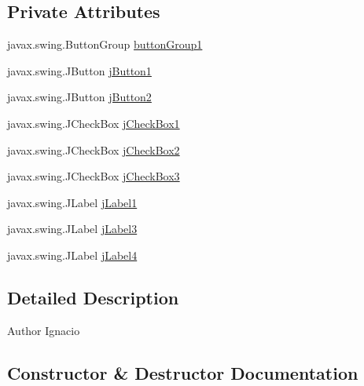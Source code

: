 \subsection*{Private Attributes}
\begin{DoxyCompactItemize}
\item 
javax.\+swing.\+Button\+Group \mbox{\hyperlink{classsoftware_1_1_aceptar_peticiones_a6530d813f8beb36dd957644716c9a51e}{button\+Group1}}
\item 
javax.\+swing.\+J\+Button \mbox{\hyperlink{classsoftware_1_1_aceptar_peticiones_a0dbb46cb648a55e144e5334959c9a068}{j\+Button1}}
\item 
javax.\+swing.\+J\+Button \mbox{\hyperlink{classsoftware_1_1_aceptar_peticiones_ac78871be271223b0cf33bcee93b44687}{j\+Button2}}
\item 
javax.\+swing.\+J\+Check\+Box \mbox{\hyperlink{classsoftware_1_1_aceptar_peticiones_aaa4f8e7bc9bf52be8ee72e4baf0ccce6}{j\+Check\+Box1}}
\item 
javax.\+swing.\+J\+Check\+Box \mbox{\hyperlink{classsoftware_1_1_aceptar_peticiones_aedf3e1a05531ef046c98a870dfe5f898}{j\+Check\+Box2}}
\item 
javax.\+swing.\+J\+Check\+Box \mbox{\hyperlink{classsoftware_1_1_aceptar_peticiones_a7b914f4724640bc95273e5119651f9a7}{j\+Check\+Box3}}
\item 
javax.\+swing.\+J\+Label \mbox{\hyperlink{classsoftware_1_1_aceptar_peticiones_a4678a7287858835aca98294897b6e05c}{j\+Label1}}
\item 
javax.\+swing.\+J\+Label \mbox{\hyperlink{classsoftware_1_1_aceptar_peticiones_af8e9b26223cf00481a430c6780ffef22}{j\+Label3}}
\item 
javax.\+swing.\+J\+Label \mbox{\hyperlink{classsoftware_1_1_aceptar_peticiones_ae9e89fa13ccf9f0b425175204554f58c}{j\+Label4}}
\end{DoxyCompactItemize}


\subsection{Detailed Description}
\begin{DoxyAuthor}{Author}
Ignacio 
\end{DoxyAuthor}


\subsection{Constructor \& Destructor Documentation}
\mbox{\label{classsoftware_1_1_aceptar_peticiones_a0e69d28d493fab6343457aef7bc93d45}} 
